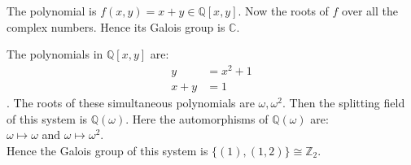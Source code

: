 \begin{example}
  The polynomial is \(f(x,y)=x+y \in \mathbb{Q}[x,y]\). Now the roots of \(f\) over all the complex numbers. Hence its Galois group is \(\mathbb{C}\).
\end{example}

\hspace{5mm}
\begin{example}
  The polynomials in \(\mathbb{Q}[x,y]\) are: \begin{align}
                         y &= x^2+1 \\
                         x+y &=1
                       \end{align}.
                       The roots of these simultaneous polynomials are \(\omega, {\omega}^2\). Then the splitting field of this system is \(\mathbb{Q}(\omega)\). Here the automorphisms of \(\mathbb{Q}(\omega)\) are: \\
       \(\omega \longmapsto \omega\) and \hspace{9mm} \(\omega \longmapsto {\omega}^2\).\\
                       Hence the Galois group of this system is \(\{(1), (1,2)\} \cong {\mathbb{Z}}_2\).
\end{example}

